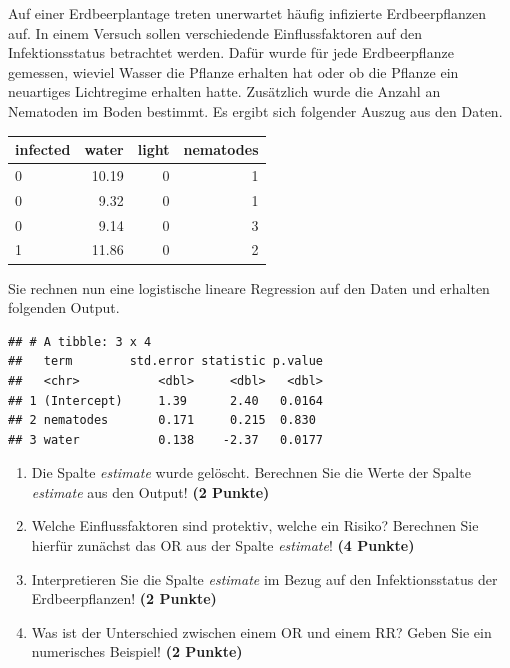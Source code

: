 \documentclass[a4paper, 10pt]{scrartcl}\usepackage[]{graphicx}\usepackage[]{xcolor}
\makeatletter
\newenvironment{kframe}{%
 \def\at@end@of@kframe{}%
 \ifinner\ifhmode%
  \def\at@end@of@kframe{\end{minipage}}%
  \begin{minipage}{\columnwidth}%
 \fi\fi%
 \def\FrameCommand##1{\hskip\@totalleftmargin \hskip-\fboxsep
 \colorbox{shadecolor}{##1}\hskip-\fboxsep
     \hskip-\linewidth \hskip-\@totalleftmargin \hskip\columnwidth}%
 \MakeFramed {\advance\hsize-\width
   \@totalleftmargin\z@ \linewidth\hsize
   \@setminipage}}%
 {\par\unskip\endMakeFramed%
 \at@end@of@kframe}
\newenvironment{knitrout}{}{} %
\makeatother
\begin{document}
Auf einer Erdbeerplantage treten unerwartet h{\"a}ufig infizierte
Erdbeerpflanzen auf. In einem Versuch sollen verschiedende Einflussfaktoren
auf den Infektionsstatus betrachtet werden. Daf{\"u}r wurde f{\"u}r jede
Erdbeerpflanze gemessen, wieviel Wasser die Pflanze erhalten hat oder ob
die Pflanze ein neuartiges Lichtregime erhalten hatte. Zus{\"a}tzlich wurde die
Anzahl an Nematoden im Boden bestimmt. Es ergibt sich folgender Auszug aus
den Daten.

\begin{knitrout}
\color{fgcolor}\begin{table}[!h]
\centering
\begin{tabular}{lrrr}
\toprule
infected & water & light & nematodes\\
\midrule
0 & 10.19 & 0 & 1\\
0 & 9.32 & 0 & 1\\
0 & 9.14 & 0 & 3\\
1 & 11.86 & 0 & 2\\
\bottomrule
\end{tabular}
\end{table}

\end{knitrout}

Sie rechnen nun eine logistische lineare Regression auf den Daten und erhalten
folgenden \Rlogo Output.

\begin{knitrout}
\color{fgcolor}\begin{kframe}
\begin{verbatim}
## # A tibble: 3 x 4
##   term        std.error statistic p.value
##   <chr>           <dbl>     <dbl>   <dbl>
## 1 (Intercept)     1.39      2.40   0.0164
## 2 nematodes       0.171     0.215  0.830 
## 3 water           0.138    -2.37   0.0177
\end{verbatim}
\end{kframe}
\end{knitrout}


\begin{enumerate}
\item Die Spalte \textit{estimate} wurde gel{\"o}scht. Berechnen Sie die Werte
  der Spalte \textit{estimate} aus den \Rlogo Output! \textbf{(2 Punkte)}
\item Welche Einflussfaktoren sind protektiv, welche ein Risiko? Berechnen
  Sie hierf{\"u}r zun{\"a}chst das OR aus der Spalte \textit{estimate}! \textbf{(4 Punkte)}
\item Interpretieren Sie die Spalte \textit{estimate} im Bezug auf den
  Infektionsstatus der Erdbeerpflanzen! \textbf{(2 Punkte)}
\item Was ist der Unterschied zwischen einem OR und einem RR? Geben Sie ein
  numerisches Beispiel! \textbf{(2 Punkte)}
\end{enumerate}
 
\end{document}
